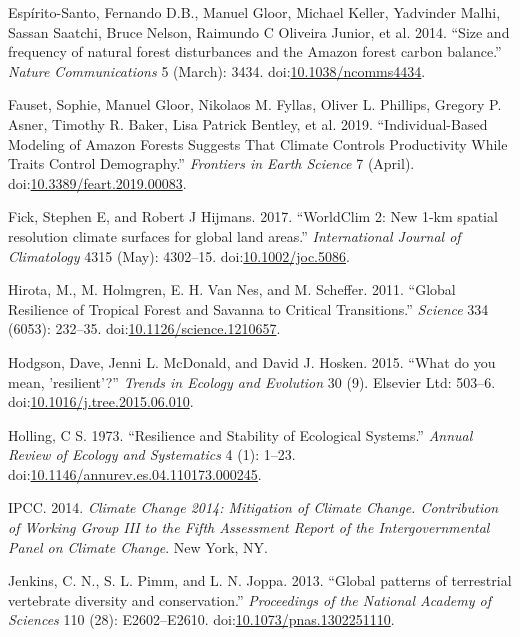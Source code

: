 \documentclass[]{elsarticle} %
\begin{document}
\hypertarget{ref-Espirito-Santo2014}{}
Espírito-Santo, Fernando D.B., Manuel Gloor, Michael Keller, Yadvinder
Malhi, Sassan Saatchi, Bruce Nelson, Raimundo C Oliveira Junior, et al.
2014. ``Size and frequency of natural forest disturbances and the Amazon
forest carbon balance.'' \emph{Nature Communications} 5 (March): 3434.
doi:\href{https://doi.org/10.1038/ncomms4434}{10.1038/ncomms4434}.

\hypertarget{ref-Fauset2019}{}
Fauset, Sophie, Manuel Gloor, Nikolaos M. Fyllas, Oliver L. Phillips,
Gregory P. Asner, Timothy R. Baker, Lisa Patrick Bentley, et al. 2019.
``Individual-Based Modeling of Amazon Forests Suggests That Climate
Controls Productivity While Traits Control Demography.'' \emph{Frontiers
in Earth Science} 7 (April).
doi:\href{https://doi.org/10.3389/feart.2019.00083}{10.3389/feart.2019.00083}.

\hypertarget{ref-Fick2017}{}
Fick, Stephen E, and Robert J Hijmans. 2017. ``WorldClim 2: New 1-km
spatial resolution climate surfaces for global land areas.''
\emph{International Journal of Climatology} 4315 (May): 4302--15.
doi:\href{https://doi.org/10.1002/joc.5086}{10.1002/joc.5086}.

\hypertarget{ref-Hirota2011}{}
Hirota, M., M. Holmgren, E. H. Van Nes, and M. Scheffer. 2011. ``Global
Resilience of Tropical Forest and Savanna to Critical Transitions.''
\emph{Science} 334 (6053): 232--35.
doi:\href{https://doi.org/10.1126/science.1210657}{10.1126/science.1210657}.

\hypertarget{ref-Hodgson2015}{}
Hodgson, Dave, Jenni L. McDonald, and David J. Hosken. 2015. ``What do
you mean, 'resilient'?'' \emph{Trends in Ecology and Evolution} 30 (9).
Elsevier Ltd: 503--6.
doi:\href{https://doi.org/10.1016/j.tree.2015.06.010}{10.1016/j.tree.2015.06.010}.

\hypertarget{ref-Holling1973}{}
Holling, C S. 1973. ``Resilience and Stability of Ecological Systems.''
\emph{Annual Review of Ecology and Systematics} 4 (1): 1--23.
doi:\href{https://doi.org/10.1146/annurev.es.04.110173.000245}{10.1146/annurev.es.04.110173.000245}.

\hypertarget{ref-IPCC2014}{}
IPCC. 2014. \emph{Climate Change 2014: Mitigation of Climate Change.
Contribution of Working Group III to the Fifth Assessment Report of the
Intergovernmental Panel on Climate Change}. New York, NY.

\hypertarget{ref-Jenkins2013}{}
Jenkins, C. N., S. L. Pimm, and L. N. Joppa. 2013. ``Global patterns of
terrestrial vertebrate diversity and conservation.'' \emph{Proceedings
of the National Academy of Sciences} 110 (28): E2602--E2610.
doi:\href{https://doi.org/10.1073/pnas.1302251110}{10.1073/pnas.1302251110}.
\end{document}
